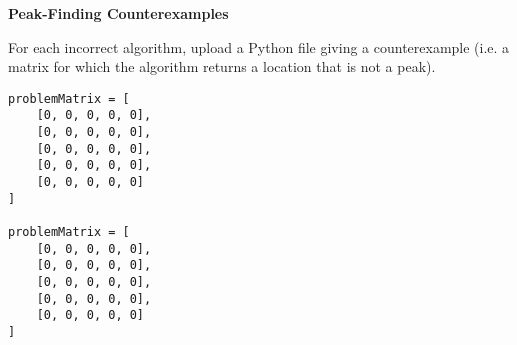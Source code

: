 \documentclass[12pt,twoside]{article}
\begin{document}
\begin{problems}
    \ifsolution \solution{}

    \fi

    \problem {} \textbf{Peak-Finding Counterexamples}

    For each incorrect algorithm, upload a Python file giving a counterexample
    (i.e. a matrix for which the algorithm returns a location that is not a peak).

    \ifsolution \solution{}
        \begin{verbatim}
problemMatrix = [
    [0, 0, 0, 0, 0],
    [0, 0, 0, 0, 0],
    [0, 0, 0, 0, 0],
    [0, 0, 0, 0, 0],
    [0, 0, 0, 0, 0]
]

problemMatrix = [
    [0, 0, 0, 0, 0],
    [0, 0, 0, 0, 0],
    [0, 0, 0, 0, 0],
    [0, 0, 0, 0, 0],
    [0, 0, 0, 0, 0]
]
\end{verbatim}
    \fi

\end{problems}
\end{document}
